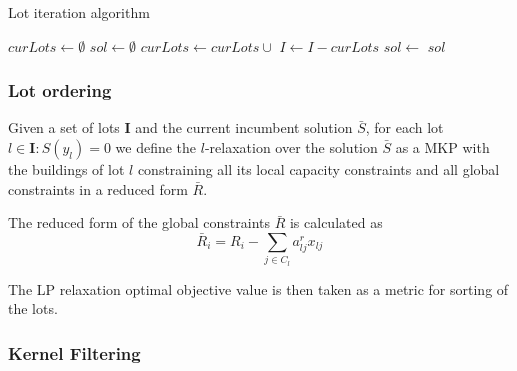 \documentclass[a4paper, twocolumn, oneside]{article}
\begin{document}
\begin{algorithm}
	\caption{Lot iteration algorithm}\label{alg:lot-iter}
	\begin{algorithmic}
		\State $curLots \gets \emptyset$
		\State $sol \gets \emptyset$
		\State {}
			\State $curLots \gets curLots \cup $
			\State $I \gets I - curLots$
			\State $sol \gets $
		\EndWhile
		\State \Return $sol$
		\EndFunction
	\end{algorithmic}
\end{algorithm}

\subsubsection{Lot ordering}\label{sec:lot-iteration-ordering}
Given a set of lots \(\mathbf{I}\) and the current incumbent solution \(\bar{S}\), for each lot \(l \in \mathbf{I}: S(y_l) = 0\) we define the \(l\)-relaxation over the solution \(\bar{S}\) as a \ac{MKP} with the buildings of lot \(l\) constraining all its local capacity constraints and all global constraints in a reduced form \(\bar{R}\). 

The reduced form of the global constraints \(\bar{R}\) is calculated as \[\bar{R}_i = R_i - \sum_{j \in C_l} a^r_{lj}x_{lj} \]

The LP relaxation optimal objective value is then taken as a metric for sorting of the lots.



\subsubsection{Kernel Filtering}\label{sec:kernel-filterung}

\clearpage
\printbibliography
\end{document}
